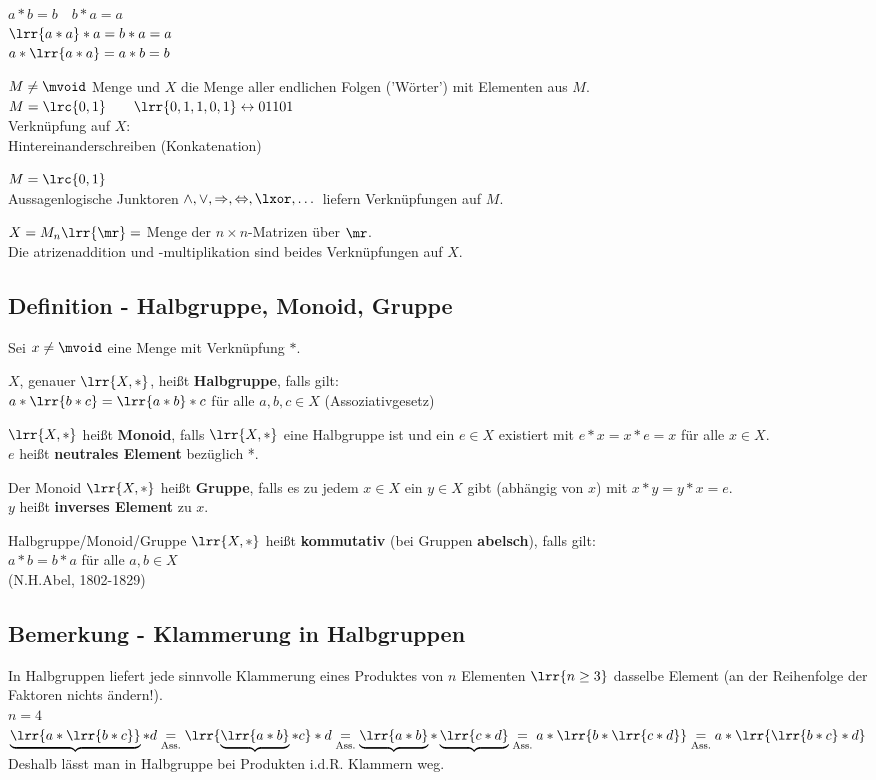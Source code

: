 			$a*b=b\quad b*a=a$\\
			$\lrr{a*a}*a=b*a=a$\\
			$a*\lrr{a*a}=a*b=b$
		\item $M\neq\mvoid$ Menge und $X$ die Menge aller endlichen Folgen ('Wörter') mit Elementen aus $M$.\\
			$M=\lrc{0,1}\qquad\lrr{0,1,1,0,1}\leftrightarrow 01101$\\
			Verknüpfung auf $X$:\\
			Hintereinanderschreiben (Konkatenation)
		\item $M=\lrc{0,1}$\\
			Aussagenlogische Junktoren $\land,\lor,\Rightarrow,\Leftrightarrow,\lxor,\dots$ liefern Verknüpfungen auf $M$.
		\item $X=M_n\lrr{\mr}=$ Menge der $n\times n$-Matrizen über $\mr$.\\
			Die atrizenaddition und -multiplikation sind beides Verknüpfungen auf $X$.
	\subExEnd
\subsection{Definition - Halbgruppe, Monoid, Gruppe}
	Sei $x\neq\mvoid$ eine Menge mit Verknüpfung $*$.
		\item $X$, genauer $\lrr{X,*}$, heißt \textbf{Halbgruppe}, falls gilt: \\
			$a*\lrr{b*c}=\lrr{a*b}*c$ für alle $a,b,c\in X$ (Assoziativgesetz)
		\item $\lrr{X,*}$ heißt \textbf{Monoid}, falls $\lrr{X,*}$ eine Halbgruppe ist und ein $e\in X$ existiert mit $e*x=x*e=x$ für alle $x\in X$. \\
			$e$ heißt \textbf{neutrales Element} bezüglich *.
		\item Der Monoid $\lrr{X,*}$ heißt \textbf{Gruppe}, falls es zu jedem $x\in X$ ein $y\in X$ gibt (abhängig von $x$) mit $x*y=y*x = e$.\\
			$y$ heißt \textbf{inverses Element} zu $x$.
		\item Halbgruppe/Monoid/Gruppe $\lrr{X,*}$ heißt \textbf{kommutativ} (bei Gruppen \textbf{abelsch}), falls gilt:\\
			$a*b=b*a$ für alle $a,b\in X$ \\
			(N.H.Abel, 1802-1829)
	\subExEnd
\subsection{Bemerkung - Klammerung in Halbgruppen}
	In Halbgruppen liefert jede sinnvolle Klammerung eines Produktes von $n$ Elementen $\lrr{n\geq 3}$ dasselbe Element (an der Reihenfolge der Faktoren nichts ändern!).\\
	$n=4$\\
	$\underbrace{\lrr{a*\lrr{b*c}}}*d\underset{\mbox{\scriptsize Ass.}}{=}\lrr{\underbrace{\lrr{a*b}}*c}*d\underset{\mbox{\scriptsize Ass.}}{=}\underbrace{\lrr{a*b}}*\underbrace{\lrr{c*d}}\underset{\mbox{\scriptsize Ass.}}{=}a*\lrr{b*\lrr{c*d}}\underset{\mbox{\scriptsize Ass.}}{=}a*\lrr{\lrr{b*c}*d}$\\
	Deshalb lässt man in Halbgruppe bei Produkten i.d.R. Klammern weg.
	
